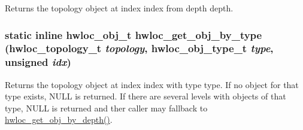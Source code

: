 Returns the topology object at index {\ttfamily index} from depth {\ttfamily depth}. \hypertarget{group__hwlocality__traversal_ga718b83f189c970ad16b4ec068df18612}{
\subsubsection[{hwloc\_\-get\_\-obj\_\-by\_\-type}]{\setlength{\rightskip}{0pt plus 5cm}static inline {\bf hwloc\_\-obj\_\-t} hwloc\_\-get\_\-obj\_\-by\_\-type ({\bf hwloc\_\-topology\_\-t} {\em topology}, \/  {\bf hwloc\_\-obj\_\-type\_\-t} {\em type}, \/  unsigned {\em idx})}}
\label{group__hwlocality__traversal_ga718b83f189c970ad16b4ec068df18612}


Returns the topology object at index {\ttfamily index} with type {\ttfamily type}. If no object for that type exists, {\ttfamily NULL} is returned. If there are several levels with objects of that type, {\ttfamily NULL} is returned and ther caller may fallback to \hyperlink{group__hwlocality__traversal_gabf8a98ad085460a4982cc7b74c344b71}{hwloc\_\-get\_\-obj\_\-by\_\-depth()}. 
